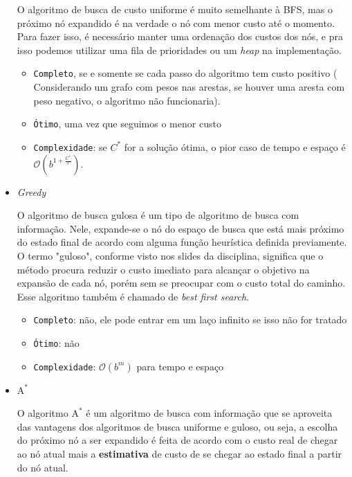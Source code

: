 \documentclass{article}
\begin{document}
\begin{itemize}
	      O algoritmo de busca de custo uniforme é muito semelhante à BFS, mas
	      o próximo nó expandido é na verdade o nó com menor custo até o momento. Para fazer isso,
	      é necessário manter uma ordenação dos custos dos nós, e pra isso
	      podemos utilizar uma fila de prioridades ou um \textit{heap} na
	      implementação.

	      \begin{itemize}
		      \item \texttt{Completo}, se e somente se cada passo do algoritmo tem custo positivo (
		            Considerando um grafo com pesos nas arestas, se houver uma aresta com peso negativo, o algoritmo
		            não funcionaria).
		      \item \texttt{Ótimo}, uma vez que seguimos o menor custo
		      \item \texttt{Complexidade}: se \(C^*\) for a solução ótima,
		            o pior caso de tempo e espaço é \(\mathcal{O}(b^{1 + \frac{C^*}{\epsilon}})\).
	      \end{itemize}

	\item \textit{Greedy}

	      O algoritmo de busca gulosa é um tipo de algoritmo de busca com informação. Nele, expande-se o nó do espaço de busca que está mais próximo
	      do estado final de acordo com alguma função heurística definida previamente. O termo "guloso", conforme visto nos slides da disciplina, significa que o método
	      procura reduzir o custo imediato para
	      alcançar o objetivo na expansão de cada nó,
	      porém sem se preocupar com o custo total
	      do caminho. Esse algoritmo também é chamado de \textit{best first search}.

	      \begin{itemize}
		      \item \texttt{Completo}: não, ele pode entrar em um laço infinito se isso não for tratado
		      \item \texttt{Ótimo}: não
		      \item \texttt{Complexidade}: \(\mathcal{O}(b^m)\) para tempo e espaço
	      \end{itemize}

	\item \(\text{A}^*\)

	      O algoritmo \(\text{A}^*\) é um algoritmo de busca com informação que se aproveita das vantagens dos algoritmos de busca uniforme e guloso, ou seja,
	      a escolha do próximo nó a ser expandido é feita de acordo com o custo real de chegar ao nó atual mais a \textbf{estimativa} de custo de se chegar ao estado final a partir do nó atual.


\end{itemize}
\end{document}
